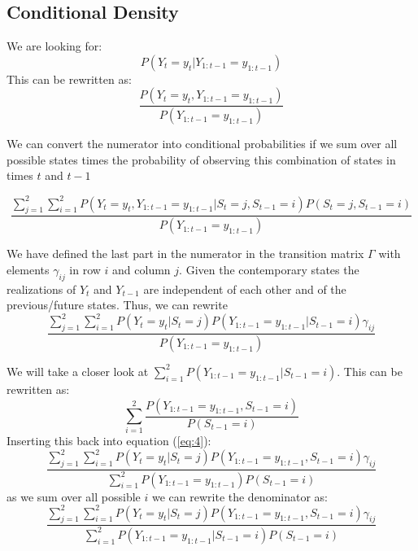 \documentclass[11pt]{article}
\begin{document}
\subsection{Conditional Density} %

We are looking for:
\begin{equation}
  \label{eq:1}
  P(Y_t=y_t|Y_{1:t-1}=y_{1:t-1})
\end{equation}
This can be rewritten as:
\begin{equation}
  \label{eq:2}
  \frac{P(Y_t=y_t, Y_{1:t-1}=y_{1:t-1})}{P(Y_{1:t-1}=y_{1:t-1})} 
\end{equation}

We can convert the numerator into conditional probabilities if we sum over all possible states times the probability of observing this combination of states in times $t$ and $t-1$

\begin{equation}
  \label{eq:3}
  \frac{\sum_{j=1}^2 \sum_{i=1}^2 P(Y_t=y_t, Y_{1:t-1}=y_{1:t-1}|S_t=j, S_{t-1}=i)P(S_t=j, S_{t-1} = i)}{P(Y_{1:t-1}=y_{1:t-1})}
\end{equation}

We have defined the last part in the numerator in the transition matrix $\Gamma$ with elements $\gamma_{ij}$ in row $i$ and column $j$.
Given the contemporary states the realizations of $Y_t$ and $Y_{t-1}$ are independent of each other and of the previous/future states. Thus, we can rewrite
\begin{equation}
  \label{eq:4}
  \frac{\sum_{j=1}^2 \sum_{i=1}^2 P(Y_t=y_t|S_t=j) P(Y_{1:t-1}=y_{1:t-1}|S_{t-1}=i) \gamma_{ij}}{P(Y_{1:t-1}=y_{1:t-1})}
\end{equation}

We will take a closer look at $ \sum_{i=1}^2 P(Y_{1:t-1}=y_{1:t-1}|S_{t-1}=i)$. This can be rewritten as:
\begin{equation}
  \label{eq:5}
 \sum_{i=1}^2 \frac{P(Y_{1:t-1}=y_{1:t-1},S_{t-1}=i)}{P(S_{t-1} = i)}
\end{equation}
Inserting this back into equation (\ref{eq:4}):
\begin{equation}
  \label{eq:6}
  \frac{\sum_{j=1}^2 \sum_{i=1}^2 P(Y_t=y_t|S_t=j) P(Y_{1:t-1}=y_{1:t-1},S_{t-1}=i) \gamma_{ij}}{\sum_{i=1}^2 P(Y_{1:t-1}=y_{1:t-1}) P(S_{t-1} = i)}
\end{equation}
as we sum over all possible $i$ we can rewrite the denominator as:
\begin{equation}
  \label{eq:7}
    \frac{\sum_{j=1}^2 \sum_{i=1}^2 P(Y_t=y_t|S_t=j) P(Y_{1:t-1}=y_{1:t-1},S_{t-1}=i) \gamma_{ij}}{\sum_{i=1}^2 P(Y_{1:t-1}=y_{1:t-1}|S_{t-1} = i) P(S_{t-1} = i)}
\end{equation}
\end{document}
